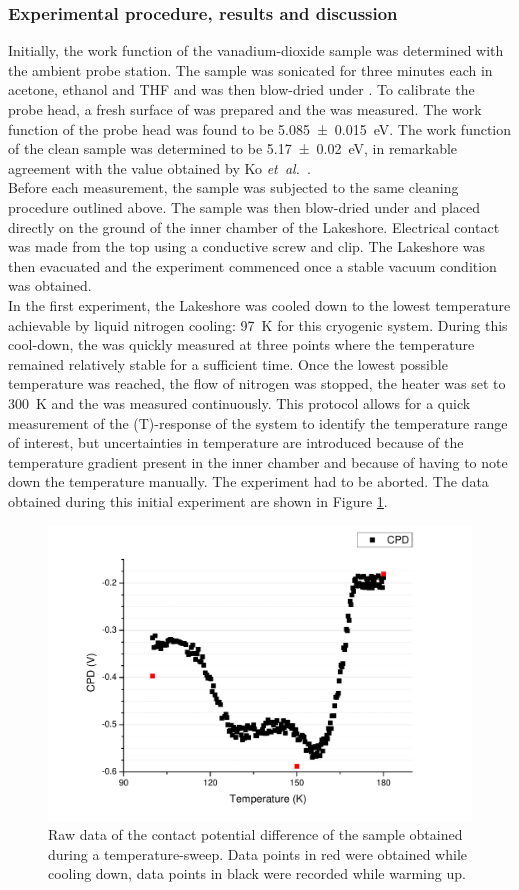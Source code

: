 \subsubsection{Experimental procedure, results and discussion}
Initially, the work function of the vanadium-dioxide sample was determined with the ambient probe station. The sample was sonicated for three minutes each in acetone, ethanol and THF and was then blow-dried under \nitro{}. To calibrate the probe head, a fresh surface of \hopg{} was prepared and the \cpd{} was measured. The work function of the probe head was found to be \SI{5.085+-0.015}{\electronvolt}. The work function of the clean \wvadiox{} sample was determined to be \SI{5.17+-0.02}{\electronvolt}, in remarkable agreement with the value obtained by Ko \emph{et~al.}~\cite{ko_kp}.\\
Before each measurement, the sample was subjected to the same cleaning procedure outlined above. The sample was then blow-dried under \nitro{} and placed directly on the ground of the inner chamber of the Lakeshore. Electrical contact was made from the top using a conductive screw and clip. The Lakeshore was then evacuated and the experiment commenced once a stable vacuum condition was obtained.\\
In the first experiment, the Lakeshore was cooled down to the lowest temperature achievable by liquid nitrogen cooling: \SI{97}{\kelvin} for this cryogenic system. During this cool-down, the \cpd{} was quickly measured at three points where the temperature remained relatively stable for a sufficient time. Once the lowest possible temperature was reached, the flow of nitrogen was stopped, the heater was set to \SI{300}{\kelvin} and the \cpd{} was measured continuously. This protocol allows for a quick measurement of the \cpd{}(T)-response of the system to identify the temperature range of interest, but uncertainties in temperature are introduced because of the temperature gradient present in the inner chamber and because of having to note down the temperature manually. The experiment had to be aborted. The data obtained during this initial experiment are shown in Figure \ref{fig:vox1}.\\
\begin{figure}
\centering
	\includegraphics[width=0.8\linewidth]{./figs/vox1}
	\caption{Raw data of the contact potential difference of the \wvadiox{} sample obtained during a temperature-sweep. Data points in red were obtained while cooling down, data points in black were recorded while warming up.}
	\label{fig:vox1}
\end{figure}
